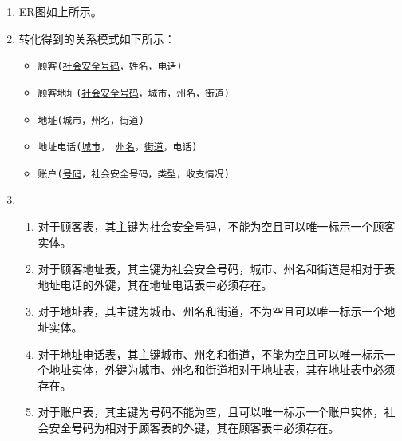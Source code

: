 \documentclass[10pt,a4paper]{article}
\begin{document}
	\begin{enumerate} 
		\item ER图如上所示。
		\item 转化得到的关系模式如下所示：
		\begin{itemize}
			\item \texttt{顾客(\underline{社会安全号码}，姓名，电话)}
			\item \texttt{顾客地址(\underline{社会安全号码}，城市，州名，街道)}
			\item \texttt{地址(\underline{城市}，\underline{州名}，\underline{街道})}
			\item \texttt{地址电话(\underline{城市}， \underline{州名}，\underline{街道}，电话)}
			\item \texttt{账户(\underline{号码}，社会安全号码，类型，收支情况)}
		\end{itemize}
		\item \begin{enumerate}
			\item 对于顾客表，其主键为社会安全号码，不能为空且可以唯一标示一个顾客实体。
			\item 对于顾客地址表，其主键为社会安全号码，城市、州名和街道是相对于表地址电话的外键，其在地址电话表中必须存在。
			\item 对于地址表，其主键为城市、州名和街道，不为空且可以唯一标示一个地址实体。
			\item 对于地址电话表，其主键城市、州名和街道，不能为空且可以唯一标示一个地址实体，外键为城市、州名和街道相对于地址表，其在地址表中必须存在。
			\item 对于账户表，其主键为号码不能为空，且可以唯一标示一个账户实体，社会安全号码为相对于顾客表的外键，其在顾客表中必须存在。
		\end{enumerate}
	\end{enumerate}
	\newpage
\end{document}
